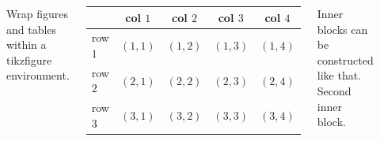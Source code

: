 \documentclass[dvipsnames,table,portrait]{tikzposter}
\begin{document}
\begin{columns}

	{
		Wrap figures and tables within a tikzfigure environment.

		\begin{tikzfigure}[]
			\begin{tabular}{lcccc}
				\toprule
				& col $1$ & col $2$ & col $3$ & col  $4$ \\
				\midrule
				row $1$ & $(1,1)$ & $(1,2)$ & $(1,3)$ & $(1,4)$ \\
				row $2$ & $(2,1)$ & $(2,2)$ & $(2,3)$ & $(2,4)$ \\
				row $3$ & $(3,1)$ & $(3,2)$ & $(3,3)$ & $(3,4)$ \\
				\bottomrule
			\end{tabular}
		\end{tikzfigure}
	}

	{
		{
			Inner blocks can be constructed like that.
		}
		\lipsum[1-1]
		\vspace{0.5em}
		{
			Second inner block.
		}
		\lipsum[2-2]
	}


	{
		\lipsum[3-5]
	}

	{
		\begin{tikzfigure}[]
			\includegraphics[width=30em]{ntulogo.png}
		\end{tikzfigure}
	}

	{
		\begin{minipage}{\linewidth}
		\nocite{*}
		\printbibliography[heading=none]
		\end{minipage}
	}
\end{columns}
\end{document}
